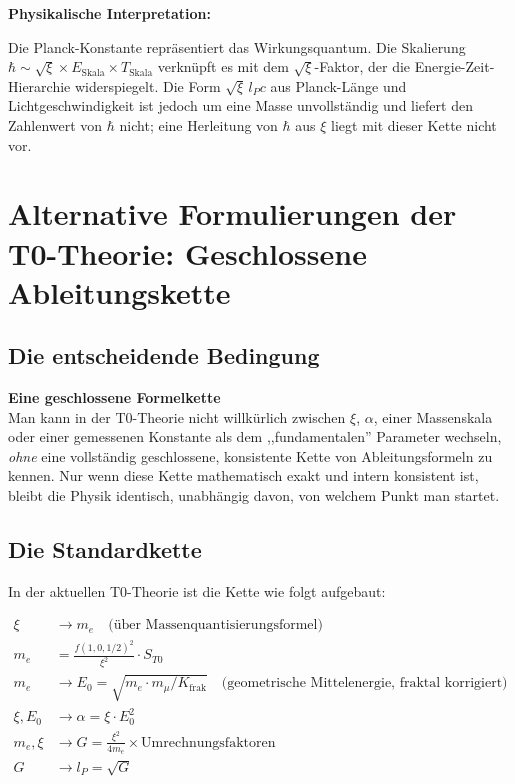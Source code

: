 	\textbf{Physikalische Interpretation:}
	
	Die Planck-Konstante repräsentiert das Wirkungsquantum. Die Skalierung $\hbar \sim \sqrt{\xi} \times E_{\text{Skala}} \times T_{\text{Skala}}$ verknüpft es mit dem $\sqrt{\xi}$-Faktor, der die Energie-Zeit-Hierarchie widerspiegelt. Die Form $\sqrt{\xi}\, l_P c$ aus Planck-Länge und Lichtgeschwindigkeit ist jedoch um eine Masse unvollständig und liefert den Zahlenwert von $\hbar$ nicht; eine Herleitung von $\hbar$ aus $\xi$ liegt mit dieser Kette nicht vor.
	
	\section{Alternative Formulierungen der T0-Theorie: Geschlossene Ableitungskette}\label{sec:alternative_formulations}
	
	\subsection{Die entscheidende Bedingung}
	
	\begin{keyresult}
		\textbf{Eine geschlossene Formelkette}\\
		Man kann in der T0-Theorie nicht willkürlich zwischen $\xi$, $\alpha$, einer Massenskala oder einer gemessenen Konstante als dem ,,fundamentalen'' Parameter wechseln, \emph{ohne} eine vollständig geschlossene, konsistente Kette von Ableitungsformeln zu kennen. Nur wenn diese Kette mathematisch exakt und intern konsistent ist, bleibt die Physik identisch, unabhängig davon, von welchem Punkt man startet.
	\end{keyresult}
	
	\subsection{Die Standardkette}
	
	In der aktuellen T0-Theorie ist die Kette wie folgt aufgebaut:
	
	\begin{align}
		\xi &\to m_e \quad \text{(über Massenquantisierungsformel)} \nonumber\\
		m_e &= \frac{f(1,0,1/2)^2}{\xi^2} \cdot S_{T0} \\
		m_e &\to E_0 = \sqrt{m_e \cdot m_\mu/K_{\text{frak}}} \quad \text{(geometrische Mittelenergie, fraktal korrigiert)} \\
		\xi, E_0 &\to \alpha = \xi \cdot E_0^2 \\
		m_e, \xi &\to G = \frac{\xi^2}{4 m_e} \times \text{Umrechnungsfaktoren} \\
		G &\to l_P = \sqrt{G}
	\end{align}
	
